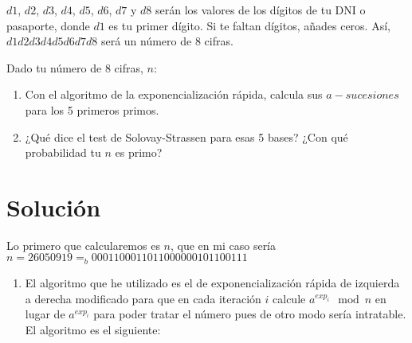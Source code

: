 	$d1$, $d2$, $d3$, $d4$, $d5$, $d6$, $d7$ y $d8$ serán los valores de los dígitos de tu DNI o pasaporte, donde $d1$
	es tu primer dígito. Si te faltan dígitos, añades ceros. Así, $d1d2d3d4d5d6d7d8$ será un número de 8 cifras.
	
	Dado tu número de 8 cifras, $n$:
	\begin{enumerate}
		\item Con el algoritmo de la exponencialización rápida, calcula sus $a-sucesiones$ para los 5 primeros primos.
		\item ¿Qué dice el test de Solovay-Strassen para esas 5 bases? ¿Con qué probabilidad tu $n$ es primo?
	\end{enumerate}

\section*{Solución}
	Lo primero que calcularemos es $n$, que en mi caso sería $n = 26050919 =_b 0001 1000 1101 1000 0001 0110 0111$
	
	\begin{enumerate}
		\item El algoritmo que he utilizado es el de exponencialización rápida de izquierda a derecha modificado
		para que en cada iteración $i$ calcule $a^{exp_i} \mod{n}$ en lugar de $a^{exp_i}$ para poder tratar el
		número pues de otro modo sería intratable. El algoritmo es el siguiente:
		
	\end{enumerate}